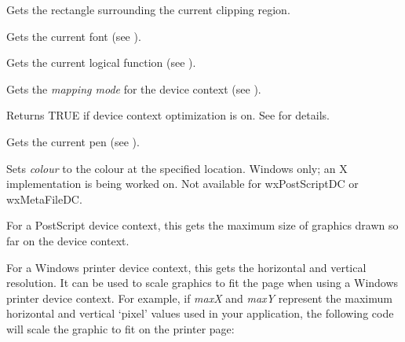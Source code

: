 Gets the rectangle surrounding the current clipping region.



Gets the current font (see ).



Gets the current logical function (see ).



Gets the {\it mapping mode} for the device context (see ).



Returns TRUE if device context optimization is on.
See  for details.



Gets the current pen (see ).



Sets {\it colour} to the colour at the specified location. Windows only; an X implementation
is being worked on. Not available for wxPostScriptDC or wxMetaFileDC.

\label{wxdcgetsize}


For a PostScript device context, this gets the maximum size of graphics
drawn so far on the device context.

For a Windows printer device context, this gets the horizontal and vertical
resolution. It can be used to scale graphics to fit the page when using
a Windows printer device context. For example, if {\it maxX} and {\it maxY}\rtfsp
represent the maximum horizontal and vertical `pixel' values used in your
application, the following code will scale the graphic to fit on the
printer page:

